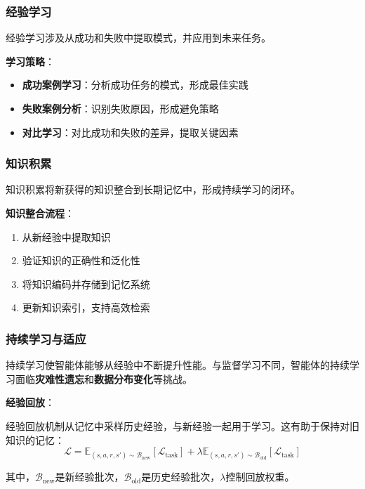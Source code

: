 \subsubsection{经验学习}

经验学习涉及从成功和失败中提取模式，并应用到未来任务。

\textbf{学习策略}：
\begin{itemize}[leftmargin=2em]
    \item \textbf{成功案例学习}：分析成功任务的模式，形成最佳实践
    \item \textbf{失败案例分析}：识别失败原因，形成避免策略
    \item \textbf{对比学习}：对比成功和失败的差异，提取关键因素
\end{itemize}

\subsubsection{知识积累}

知识积累将新获得的知识整合到长期记忆中，形成持续学习的闭环。

\textbf{知识整合流程}：
\begin{enumerate}[leftmargin=2em]
    \item 从新经验中提取知识
    \item 验证知识的正确性和泛化性
    \item 将知识编码并存储到记忆系统
    \item 更新知识索引，支持高效检索
\end{enumerate}

\subsubsection{持续学习与适应}

持续学习使智能体能够从经验中不断提升性能。与监督学习不同，智能体的持续学习面临\textbf{灾难性遗忘}和\textbf{数据分布变化}等挑战。

\textbf{经验回放}：

经验回放机制从记忆中采样历史经验，与新经验一起用于学习。这有助于保持对旧知识的记忆：
\begin{equation}
    \mathcal{L} = \mathbb{E}_{(s,a,r,s') \sim \mathcal{B}_{\text{new}}}[\mathcal{L}_{\text{task}}] + \lambda \mathbb{E}_{(s,a,r,s') \sim \mathcal{B}_{\text{old}}}[\mathcal{L}_{\text{task}}]
\end{equation}

其中，$\mathcal{B}_{\text{new}}$是新经验批次，$\mathcal{B}_{\text{old}}$是历史经验批次，$\lambda$控制回放权重。

